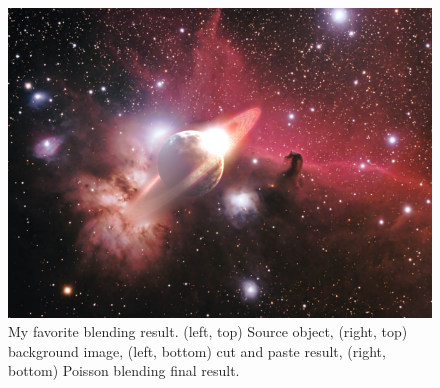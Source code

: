 \documentclass[11pt]{article}
\begin{document}
\begin{figure} [ht]
\begin{center}
\includegraphics[scale=0.39]{results_poisson/set4/im5.png}   
\caption{My favorite blending result. (left, top) Source object, (right, top) background image,   (left, bottom) cut and paste result, (right, bottom) Poisson blending final result.}
\label{2}
\end{center}
\end{figure}

\quad
\end{document}
